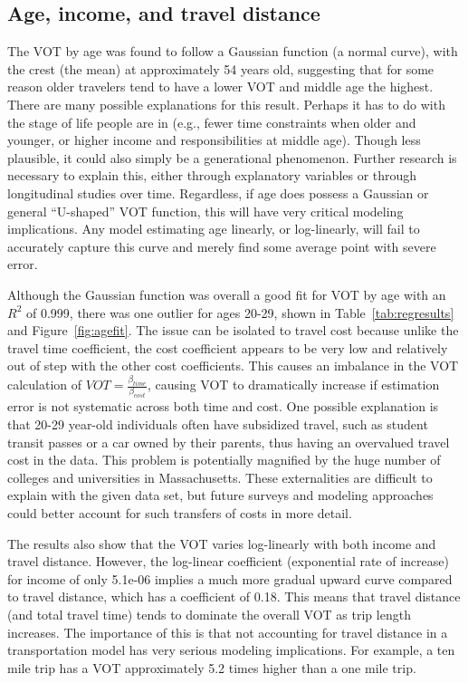 \documentclass[numbered]{trbunofficial}\usepackage[]{graphicx}\usepackage[]{color}
\begin{document}
\subsection{Age, income, and travel distance}
The VOT by age was found to follow a Gaussian function (a normal curve), with the crest (the mean) at approximately 54 years old, suggesting that for some reason older travelers tend to have a lower VOT and middle age the highest. There are many possible explanations for this result. Perhaps it has to do with the stage of life people are in (e.g., fewer time constraints when older and younger, or higher income and responsibilities at middle age). Though less plausible, it could also simply be a generational phenomenon. Further research is necessary to explain this, either through explanatory variables or through longitudinal studies over time. Regardless, if age does possess a Gaussian or general ``U-shaped'' VOT function, this will have very critical modeling implications. Any model estimating age linearly, or log-linearly, will fail to accurately capture this curve and merely find some average point with severe error.

Although the Gaussian function was overall a good fit for VOT by age with an $R^2$ of  0.999, there was one outlier for ages 20-29, shown in Table~\ref{tab:regresults} and Figure~\ref{fig:agefit}. The issue can be isolated to travel cost because unlike the travel time coefficient, the cost coefficient appears to be very low and relatively out of step with the other cost coefficients. This causes an imbalance in the VOT calculation of $VOT = \frac{\beta_{time}}{\beta_{cost}}$, causing VOT to dramatically increase if estimation error is not systematic across both time and cost. One possible explanation is that 20-29 year-old individuals often have subsidized travel, such as student transit passes or a car owned by their parents, thus having an overvalued travel cost in the data. This problem is potentially magnified by the huge number of colleges and universities in Massachusetts. These externalities are difficult to explain with the given data set, but future surveys and modeling approaches could better account for such transfers of costs in more detail. 

The results also show that the VOT varies log-linearly with both income and travel distance. However, the log-linear coefficient (exponential rate of increase) for income of only 5.1e-06 implies a much more gradual upward curve compared to travel distance, which has a coefficient of 0.18. This means that travel distance (and total travel time) tends to dominate the overall VOT as trip length increases. The importance of this is that not accounting for travel distance in a transportation model has very serious modeling implications. For example, a ten mile trip has a VOT approximately 5.2 times higher than a one mile trip.
\end{document}
